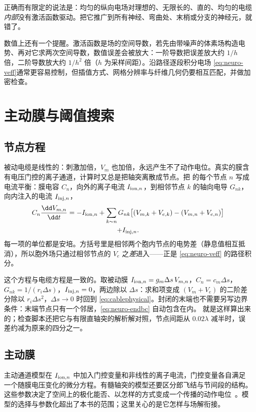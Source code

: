 \begin{pitfall}[“均匀电场不会刺激神经”]
正确而有限定的说法是：均匀的纵向电场对理想的、无限长的、直的、均匀的电缆\emph{内部}没有激活函数驱动。把它推广到所有神经、弯曲处、末梢或分支的神经元，就错了。
\end{pitfall}

数值上还有一个提醒。激活函数是场的空间导数，若先由带噪声的体素场构造电势、再对它求两次空间导数，数值误差会被放大：一阶导数把误差放大约 $1/h$ 倍，二阶导数放大约 $1/h^2$ 倍（$h$ 为采样间距）。沿路径逐段积分电场 \eqref{eq:neuro-veff}通常更容易控制，但插值方式、网格分辨率与纤维几何仍要相互匹配，并做加密检查。

\section{主动膜与阈值搜索}\label{sec:neuro-active}

\subsection{节点方程}
被动电缆是线性的：刺激加倍，$V_m$ 也加倍，永远产生不了动作电位。真实的膜含有电压门控的离子通道，计算时又总是把轴突离散成节点。把 的每个节点 $n$ 写成电流平衡：膜电容 $C_n$，向外的离子电流 $I_{{\rm ion},n}$，到相邻节点 $k$ 的轴向电导 $G_{nk}$，向内注入的电流 $I_{{\rm inj},n}$，
\begin{multline}
C_n\frac{\dd V_{m,n}}{\dd t}=-I_{{\rm ion},n}
+\sum_{k\sim n}G_{nk}\bigl[(V_{m,k}+V_{e,k})-(V_{m,n}+V_{e,n})\bigr]\\
+I_{{\rm inj},n}.
\label{eq:neuro-nodal}
\end{multline}
每一项的单位都是安培。方括号里是相邻两个胞内节点的电势差（静息值相互抵消），所以胞外场只通过相邻节点的 $V_e$ 之\emph{差}进入——正是 \eqref{eq:neuro-veff} 的路径积分。

这个方程与电缆方程是一致的。取被动膜 $I_{{\rm ion},n}=g_m\Delta s\,V_{m,n}$，$C_n=c_m\Delta s$，$G_{nk}=1/(r_i\Delta s)$，$I_{{\rm inj},n}=0$，两边除以 $\Delta s$：求和项变成 $(V_m+V_e)$ 的二阶差分除以 $r_i\Delta s^2$，$\Delta s\to0$ 时回到 \eqref{eq:cablephysical}。封闭的末端也不需要另写边界条件：末端节点只有一个邻居，\eqref{eq:neuro-endbc} 自动包含在内。 就是这样算出来的；检查脚本还把它与有限直轴突的解析解对照，节点间距从 $0.02\lambda$ 减半时，误差约减为原来的四分之一。

\subsection{主动膜}
主动通道模型在 $I_{{\rm ion},n}$ 中加入门控变量和非线性的离子电流，门控变量各自满足一个随膜电压变化的微分方程。有髓轴突的模型还要区分郎飞结与节间段的结构。这些参数决定了空间上的极化能否、以怎样的方式变成一个传播的动作电位~\cite{rattay}。模型的选择与参数化超出了本书的范围；这里关心的是它怎样与场解衔接。

